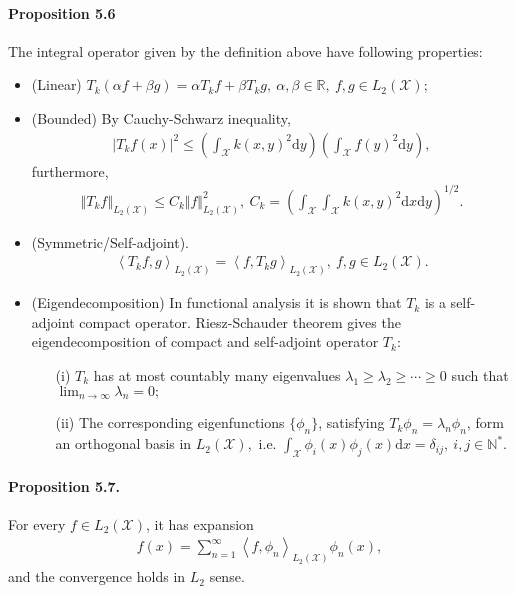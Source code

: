 \documentclass{article}
\begin{document}
\paragraph{Proposition 5.6} The integral operator given by the definition above have following properties:
\begin{itemize}
	\vspace{0.1cm}
	\item (Linear) $T_k(\alpha f + \beta g) = \alpha T_kf + \beta T_kg,\ \alpha,\beta\in\mathbb{R},\ f,g\in L_2(\mathcal{X});$
	\vspace{0.1cm}
	\item (Bounded) By Cauchy-Schwarz inequality,
	\begin{align*}
		\left\vert T_kf(x)\right\vert^2 \leq \left(\int_\mathcal{X}k(x,y)^2\mathrm{d}y\right)\left(\int_\mathcal{X}f(y)^2\mathrm{d}y\right),\tag{5.14}
	\end{align*}
furthermore,
\begin{align*}
	\left\Vert T_kf\right\Vert_{L_2(\mathcal{X})} \leq C_k\Vert f\Vert^2_{L_2(\mathcal{X})},\ C_k = \left(\int_\mathcal{X}\int_\mathcal{X}k(x,y)^2\mathrm{d}x\mathrm{d}y\right)^{1/2}.\tag{5.15}
\end{align*}
\item (Symmetric/Self-adjoint).
\begin{align*}
	\left\langle T_kf, g \right\rangle_{L_2(\mathcal{X})} = \left\langle f, T_kg\right\rangle_{L_2(\mathcal{X})},\ f,g\in L_2(\mathcal{X}).\tag{5.16}
\end{align*}
\item (Eigendecomposition) In functional analysis it is shown that $T_k$ is a self-adjoint compact operator. Riesz-Schauder theorem gives the eigendecomposition of compact and self-adjoint operator $T_k$:
\begin{itemize}
	\item[(i)] $T_k$ has at most countably many eigenvalues $\lambda_1\geq\lambda_2\geq\cdots\geq 0$ such that $\lim_{n\to\infty}\lambda_n = 0;$
	\item[(ii)]  The corresponding eigenfunctions $\lbrace \phi_n\rbrace$, satisfying $T_k\phi_n = \lambda_n\phi_n$, form an orthogonal basis in $L_2(\mathcal{X}),$ i.e. $\int_\mathcal{X}\phi_i(x)\phi_j(x)\mathrm{d}x = \delta_{ij},\ i, j\in\mathbb{N}^*.$
\end{itemize} 
\end{itemize}

\paragraph{Proposition 5.7.\label{prop:5.7}} For every $f\in L_2(\mathcal{X})$, it has expansion
\begin{align*}
	f(x)=\sum_{n=1}^\infty\left\langle f, \phi_n \right\rangle_{L_2(\mathcal{X})}\phi_n(x),\tag{5.17}
\end{align*}
and the convergence holds in $L_2$ sense.
\end{document}
